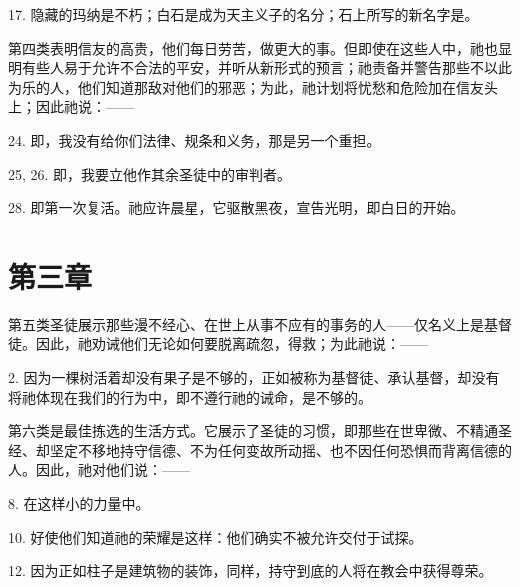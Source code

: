 17. 隐藏的玛纳是不朽；白石是成为天主义子的名分；石上所写的新名字是。\par

第四类表明信友的高贵，他们每日劳苦，做更大的事。但即使在这些人中，祂也显明有些人易于允许不合法的平安，并听从新形式的预言；祂责备并警告那些不以此为乐的人，他们知道那敌对他们的邪恶；为此，祂计划将忧愁和危险加在信友头上；因此祂说：——\par

24. 即，我没有给你们法律、规条和义务，那是另一个重担。\par

25, 26. 即，我要立他作其余圣徒中的审判者。\par

28. 即第一次复活。祂应许晨星，它驱散黑夜，宣告光明，即白日的开始。\par


\section{第三章}

第五类圣徒展示那些漫不经心、在世上从事不应有的事务的人——仅名义上是基督徒。因此，祂劝诫他们无论如何要脱离疏忽，得救；为此祂说：——\par

2. 因为一棵树活着却没有果子是不够的，正如被称为基督徒、承认基督，却没有将祂体现在我们的行为中，即不遵行祂的诫命，是不够的。\par

第六类是最佳拣选的生活方式。它展示了圣徒的习惯，即那些在世卑微、不精通圣经、却坚定不移地持守信德、不为任何变故所动摇、也不因任何恐惧而背离信德的人。因此，祂对他们说：——\par

8. 在这样小的力量中。\par

10. 好使他们知道祂的荣耀是这样：他们确实不被允许交付于试探。\par

12. 因为正如柱子是建筑物的装饰，同样，持守到底的人将在教会中获得尊荣。\par


